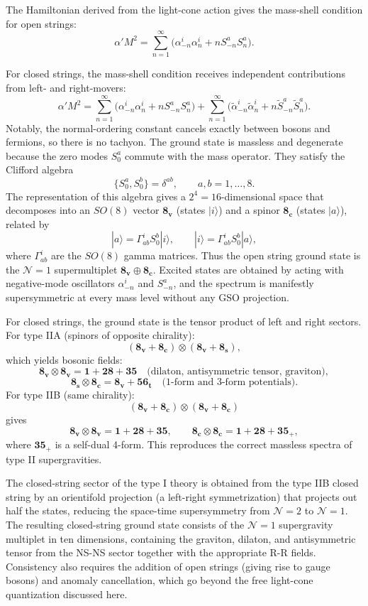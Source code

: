 \documentclass[12pt]{article}
\begin{document}
The Hamiltonian derived from the light-cone action gives the mass-shell condition for open strings:
\[
\alpha' M^{2}=\sum_{n=1}^{\infty}\bigl(\alpha_{-n}^{i}\alpha_{n}^{i}+nS_{-n}^{a}S_{n}^{a}\bigr).
\]

For closed strings, the mass-shell condition receives independent contributions from left- and right-movers:
\[
\alpha' M^{2} = \sum_{n=1}^{\infty}\bigl(\alpha_{-n}^{i}\alpha_{n}^{i}+nS_{-n}^{a}S_{n}^{a}\bigr) + \sum_{n=1}^{\infty}\bigl(\tilde{\alpha}_{-n}^{i}\tilde{\alpha}_{n}^{i}+n\tilde{S}_{-n}^{a}\tilde{S}_{n}^{a}\bigr).
\]
Notably, the normal-ordering constant cancels exactly between bosons and fermions, so there is no tachyon. The ground state is massless and degenerate because the zero modes $S_{0}^{a}$ commute with the mass operator. They satisfy the Clifford algebra
\[
\{S_{0}^{a},S_{0}^{b}\}=\delta^{ab},\qquad a,b=1,\dots,8.
\]
The representation of this algebra gives a $2^{4}=16$-dimensional space that decomposes into an $SO(8)$ vector $\mathbf{8_{v}}$ (states $|i\rangle$) and a spinor $\mathbf{8_{c}}$ (states $|a\rangle$), related by
\[
|a\rangle=\Gamma_{ab}^{i}S_{0}^{b}|i\rangle,\qquad |i\rangle=\Gamma_{ab}^{i}S_{0}^{b}|a\rangle,
\]
where $\Gamma_{ab}^{i}$ are the $SO(8)$ gamma matrices. Thus the open string ground state is the $\mathcal{N}=1$ supermultiplet $\mathbf{8_{v}}\oplus\mathbf{8_{c}}$. Excited states are obtained by acting with negative-mode oscillators $\alpha_{-n}^{i}$ and $S_{-n}^{a}$, and the spectrum is manifestly supersymmetric at every mass level without any GSO projection.

For closed strings, the ground state is the tensor product of left and right sectors. For type IIA (spinors of opposite chirality):
\[
(\mathbf{8_{v}}+\mathbf{8_{c}})\otimes(\mathbf{8_{v}}+\mathbf{8_{s}}),
\]
which yields bosonic fields:
\[
\mathbf{8_{v}}\otimes\mathbf{8_{v}}=\mathbf{1}+\mathbf{28}+\mathbf{35}\quad\text{(dilaton, antisymmetric tensor, graviton)},
\]
\[
\mathbf{8_{s}}\otimes\mathbf{8_{c}}=\mathbf{8_{v}}+\mathbf{56_{t}}\quad\text{(1-form and 3-form potentials)}.
\]
For type IIB (same chirality):
\[
(\mathbf{8_{v}}+\mathbf{8_{c}})\otimes(\mathbf{8_{v}}+\mathbf{8_{c}})
\]
gives
\[
\mathbf{8_{v}}\otimes\mathbf{8_{v}}=\mathbf{1}+\mathbf{28}+\mathbf{35},\qquad
\mathbf{8_{c}}\otimes\mathbf{8_{c}}=\mathbf{1}+\mathbf{28}+\mathbf{35}_{+},
\]
where $\mathbf{35}_{+}$ is a self-dual 4-form. This reproduces the correct massless spectra of type II supergravities. 

The closed-string sector of the type I theory is obtained from the type IIB closed string by an orientifold projection (a left-right symmetrization) that projects out half the states, reducing the space-time supersymmetry from $\mathcal{N}=2$ to $\mathcal{N}=1$. The resulting closed-string ground state consists of the $\mathcal{N}=1$ supergravity multiplet in ten dimensions, containing the graviton, dilaton, and antisymmetric tensor from the NS-NS sector together with the appropriate R-R fields. Consistency also requires the addition of open strings (giving rise to gauge bosons) and anomaly cancellation, which go beyond the free light-cone quantization discussed here.
\end{document}
